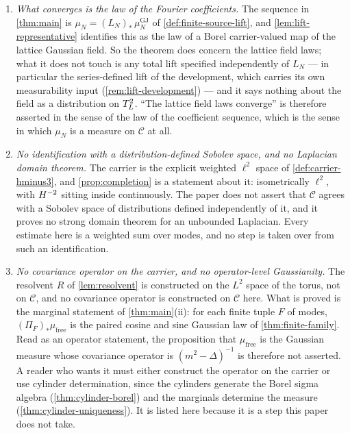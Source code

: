 \begin{enumerate}
\item \emph{What converges is the law of the Fourier coefficients.}  The
  sequence in \cref{thm:main} is $\mu_N=(L_N)_*\,\mu^{\mathrm{GJ}}_N$ of
  \cref{def:finite-source-lift}, and \cref{lem:lift-representative} identifies
  this as the law of a Borel carrier-valued map of the lattice Gaussian field.
  So the theorem does concern the lattice field laws; what it does not touch is
  any total lift specified independently of $L_N$ --- in particular the
  series-defined lift of the development, which carries its own measurability
  input (\cref{rem:lift-development}) --- and it says nothing about the field as
  a distribution on $T_L^2$.  ``The lattice field laws converge'' is therefore
  asserted in the sense of the law of the coefficient sequence, which is the
  sense in which $\mu_N$ is a measure on $\mathcal C$ at all.
\item \emph{No identification with a distribution-defined Sobolev space, and no
  Laplacian domain theorem.}  The carrier is the explicit weighted $\ell^2$
  space of \cref{def:carrier-hminus3}, and \cref{prop:completion} is a statement
  about it: isometrically $\ell^2$, with $H^{-2}$ sitting inside continuously.
  The paper does not assert that $\mathcal C$ agrees with a Sobolev space of
  distributions defined independently of it, and it proves no strong domain
  theorem for an unbounded Laplacian.  Every estimate here is a weighted sum over
  modes, and no step is taken over from such an identification.
\item \emph{No covariance operator on the carrier, and no operator-level
  Gaussianity.}  The resolvent $R$ of \cref{lem:resolvent} is constructed on the
  $L^2$ space of the torus, not on $\mathcal C$, and no covariance operator is
  constructed on $\mathcal C$ here.  What is proved is the marginal statement of
  \cref{thm:main}(ii): for each finite tuple $F$ of modes, $(\Pi_F)_*\mu_{\mathrm{free}}$
  is the paired cosine and sine Gaussian law of \cref{thm:finite-family}.  Read
  as an operator statement, the proposition that $\mu_{\mathrm{free}}$ is the
  Gaussian measure whose covariance operator is $(m^2-\Delta)^{-1}$ is therefore
  not asserted.  A reader who wants it must either construct the operator on the
  carrier or use cylinder determination, since the cylinders generate the Borel
  sigma algebra (\cref{thm:cylinder-borel}) and the marginals determine the
  measure (\cref{thm:cylinder-uniqueness}).  It is listed here because it is a
  step this paper does not take.

\end{enumerate}
